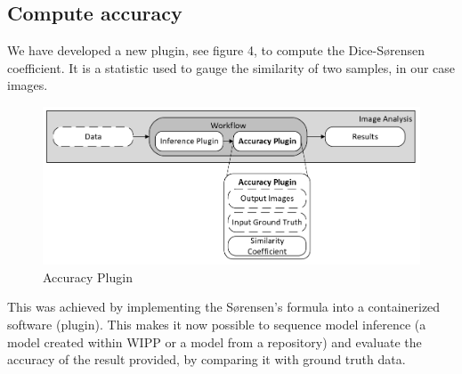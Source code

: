 \subsection{Compute accuracy}

We have developed a new plugin, see figure 4, to compute the Dice-Sørensen
coefficient. It is a statistic used to gauge the similarity of two samples, in
our case images.

\begin{figure}[H]
  \centering
  \includegraphics[width=1.0\linewidth]{png/4_accuracy.png}
  \caption{Accuracy Plugin}
  \label{fig:4accuracy}
\end{figure}

This was achieved by implementing the Sørensen's formula into a containerized
software (plugin). This makes it now possible to sequence model inference (a
model created within WIPP or a model from a repository) and evaluate the
accuracy of the result provided, by comparing it with ground truth data.
